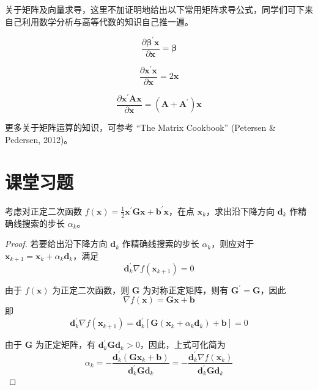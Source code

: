 \documentclass[cn]{elegantpaper}
\begin{document}
关于矩阵及向量求导，这里不加证明地给出以下常用矩阵求导公式，同学们可下来自己利用数学分析与高等代数的知识自己推一遍。

\begin{equation}
    \frac{\partial\boldsymbol{\beta}^{\prime}\mathbf{x}}{\partial\mathbf{x}}=\boldsymbol{\beta}
\end{equation}

\begin{equation}
    \frac{\partial\mathbf{x}^{\prime}\mathbf{x}}{\partial\mathbf{x}}=2\mathbf{x}
\end{equation}

\begin{equation}
    \frac{\partial\mathbf{x}^{\prime}\mathbf{A}\mathbf{x}}{\partial\mathbf{x}}=\left(\mathbf{A}+\mathbf{A}^{\prime}\right)\mathbf{x}
\end{equation}

\begin{remark}
    更多关于矩阵运算的知识，可参考 “The Matrix Cookbook” (Petersen \& Pedersen, 2012)。
\end{remark}

\section{课堂习题}

考虑对正定二次函数 $f(\mathbf{x})=\frac{1}{2}\mathbf{x}^{\prime}\mathbf{G}\mathbf{x}+\mathbf{b}^{\prime} \mathbf{x}$，在点 $\mathbf{x}_{k}$，求出沿下降方向 $\mathbf{d}_{k}$ 作精确线搜索的步长 $\alpha_{k}$。

\begin{proof}
    若要给出沿下降方向 $\mathbf{d}_{k}$ 作精确线搜索的步长 $\alpha_{k}$，则应对于 $\mathbf{x}_{k+1}=\mathbf{x}_{k}+\alpha_{k}\mathbf{d}_{k}$，满足
    \begin{equation}
        \mathbf{d}_{k}^{\prime}\nabla f(\mathbf{x}_{k+1})=0
    \end{equation}

    由于 $f(\mathbf{x})$ 为正定二次函数，则 $\mathbf{G}$ 为对称正定矩阵，则有 $\mathbf{G}^{\prime}=\mathbf{G}$，因此
    \begin{equation}
        \nabla f(\mathbf{x})=\mathbf{G}\mathbf{x}+\mathbf{b}
    \end{equation}
    即
    \begin{equation}
        \mathbf{d}_{k}^{\prime}\nabla f(\mathbf{x}_{k+1})=\mathbf{d}_{k}^{\prime}\left[\mathbf{G}\left(\mathbf{x}_{k}+\alpha_{k}\mathbf{d}_{k}\right)+\mathbf{b}\right]=0
    \end{equation}

    由于 $\mathbf{G}$ 为正定矩阵，有 $\mathbf{d}_{k}^{\prime}\mathbf{G}\mathbf{d}_{k}>0$，因此，上式可化简为
    \begin{equation}
        \alpha_{k}=-\frac{\mathbf{d}_{k}^{\prime}\left(\mathbf{G}\mathbf{x}_{k}+\mathbf{b}\right)}{\mathbf{d}_{k}^{\prime}\mathbf{G}\mathbf{d}_{k}}=-\frac{\mathbf{d}_{k}^{\prime}\nabla f(\mathbf{x}_{k})}{\mathbf{d}_{k}^{\prime}\mathbf{G}\mathbf{d}_{k}}
    \end{equation}
\end{proof}
\end{document}
